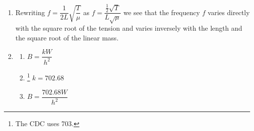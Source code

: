 \documentclass{ximera}
\begin{document}
\begin{enumerate}
\setcounter{enumi}{\value{HW}}

\item Rewriting $f = \dfrac{1}{2L} \sqrt{\dfrac{T}{\mu}}$ as $f = \dfrac{\frac{1}{2} \sqrt{T}}{L \sqrt{\mu}}$ we see that the frequency $f$ varies directly with the square root of the tension and varies inversely with the length and the square root of the linear mass.

\item \begin{multicols}{3} 
\begin{enumerate}
\item $B = \dfrac{kW}{h^{2}}$
\item \hspace{-.1in} \footnote{The CDC uses 703.} $k = 702.68$ 
\item $B = \dfrac{702.68W}{h^{2}}$
\end{enumerate}
\end{multicols}

\end{enumerate}
\end{document}
